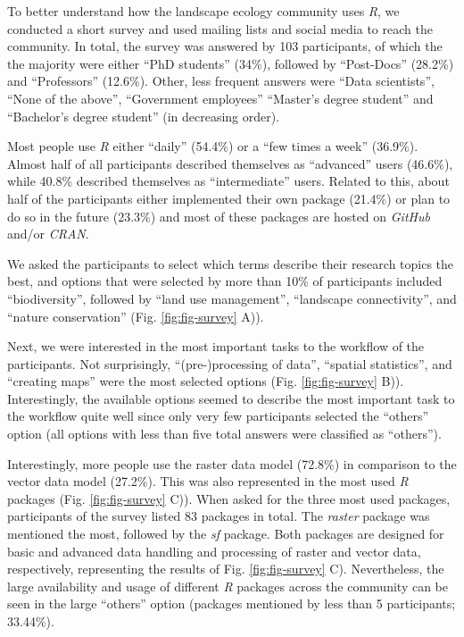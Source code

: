\documentclass[smallextended]{svjour3}       %
\begin{document}
To better understand how the landscape ecology community uses \emph{R}, we conducted a short survey and used mailing lists and social media to reach the community.
In total, the survey was answered by 103 participants, of which the the majority were either ``PhD students'' (34\%), followed by ``Post-Docs'' (28.2\%) and ``Professors'' (12.6\%).
Other, less frequent answers were ``Data scientists'', ``None of the above'', ``Government employees'' ``Master's degree student'' and ``Bachelor's degree student'' (in decreasing order).

Most people use \emph{R} either ``daily'' (54.4\%) or a ``few times a week'' (36.9\%).
Almost half of all participants described themselves as ``advanced'' users (46.6\%), while 40.8\% described themselves as ``intermediate'' users.
Related to this, about half of the participants either implemented their own package (21.4\%) or plan to do so in the future (23.3\%) and most of these packages are hosted on \emph{GitHub} and/or \emph{CRAN}.

We asked the participants to select which terms describe their research topics the best, and options that were selected by more than 10\% of participants included ``biodiversity'', followed by ``land use management'', ``landscape connectivity'', and ``nature conservation'' (Fig. \ref{fig:fig-survey} A)).

Next, we were interested in the most important tasks to the workflow of the participants.
Not surprisingly, ``(pre-)processing of data'', ``spatial statistics'', and ``creating maps'' were the most selected options (Fig. \ref{fig:fig-survey} B)).
Interestingly, the available options seemed to describe the most important task to the workflow quite well since only very few participants selected the ``others'' option (all options with less than five total answers were classified as ``others'').

Interestingly, more people use the raster data model (72.8\%) in comparison to the vector data model (27.2\%).
This was also represented in the most used \emph{R} packages (Fig. \ref{fig:fig-survey} C)).
When asked for the three most used packages, participants of the survey listed 83 packages in total.
The \emph{raster} package was mentioned the most, followed by the \emph{sf} package.
Both packages are designed for basic and advanced data handling and processing of raster and vector data, respectively, representing the results of Fig. \ref{fig:fig-survey} C).
Nevertheless, the large availability and usage of different \emph{R} packages across the community can be seen in the large ``others'' option (packages mentioned by less than 5 participants; 33.44\%).
\end{document}
